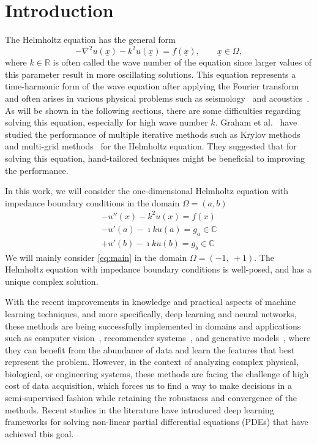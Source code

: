 \section{Introduction}

The Helmholtz equation has the general form
\begin{equation}
    \label{eq:general}
    -\nabla^2{u(\underline{x})} - k^2 u(\underline{x}) = f(\underline{x}), \qquad \underline{x} \in \Omega,
\end{equation}
where $k \in \mathbb{R}$ is often called the wave number of the equation since larger values of this parameter result in more oscillating solutions. This equation represents a time-harmonic form of the wave equation after applying the Fourier transform and often arises in various physical problems such as seismology~\cite{alkhalifah2021} and acoustics~\cite{sun2015}. As will be shown in the following sections, there are some difficulties regarding solving this equation, especially for high wave number $k$. Graham et al.~\cite{graham2012} have studied the performance of multiple iterative methods such as Krylov methods~\cite{fan2018} and multi-grid methods~\cite{xu2016} for the Helmholtz equation. They suggested that for solving this equation, hand-tailored techniques might be beneficial to improving the performance.

In this work, we will consider the one-dimensional Helmholtz equation with impedance boundary conditions in the domain $\Omega=(a, b)$
\begin{equation}
    \label{eq:main}
    \begin{aligned}
        -u''(x) - k^2 u(x) = f(x)\\
        -u'(a) - \imath k u(a) = g_a \in \mathbb{C}\\
        +u'(b) - \imath k u(b) = g_b \in \mathbb{C}
    \end{aligned}
\end{equation}
We will mainly consider \eqref{eq:main} in the domain $\Omega = (-1,\:+1)$. The Helmholtz equation with impedance boundary conditions is well-posed, and has a unique complex solution.

With the recent improvements in knowledge and practical aspects of machine learning techniques, and more specifically, deep learning and neural networks, these methods are being successfully implemented in domains and applications such as computer vision~\cite{voulodimos2018deep}, recommender systems~\cite{zhang2019deep}, and generative models~\cite{creswell2018generative}, where they can benefit from the abundance of data and learn the features that best represent the problem. However, in the context of analyzing complex physical, biological, or engineering systems, these methods are facing the challenge of high cost of data acquisition, which forces us to find a way to make decisions in a semi-supervised fashion while retaining the robustness and convergence of the methods. Recent studies in the literature have introduced deep learning frameworks for solving non-linear partial differential
equations (PDEs) that have achieved this goal.

